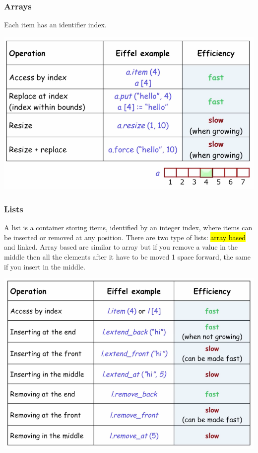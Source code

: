 \documentclass[11pt]{article}
\begin{document}
\subsubsection{Arrays}
Each item has an identifier index.\\
\begin{center}
	
\end{center}
\begin{center}
	\includegraphics[width = 15cm]{Eprog/array}
\end{center}
\subsubsection{Lists}
A list is a container storing items, identified by an integer index, where items can be inserted or removed at any position. There are two type of lists: \hl{array based} and linked. Array based are similar to array but if you remove a value in the middle then all the elements after it have to be moved 1 space forward, the same if you insert in the middle.
\begin{center}
	\includegraphics[width = 15cm]{Eprog/list}
\end{center}
\end{document}
